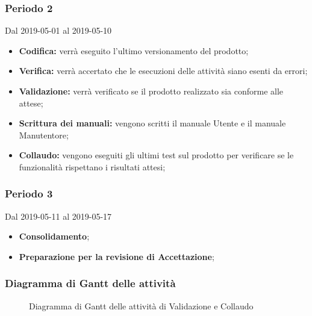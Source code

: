 \subsubsection{Periodo 2} 
Dal 2019-05-01 al 2019-05-10
\begin{itemize}
	\item \textbf{Codifica:} verrà eseguito l'ultimo versionamento del prodotto;
	\item \textbf{Verifica:} verrà accertato che le esecuzioni delle attività siano esenti da errori;
	\item \textbf{Validazione:} verrà verificato se il prodotto realizzato sia conforme alle attese;
	\item \textbf{Scrittura dei manuali:} vengono scritti il manuale Utente e il manuale Manutentore;
	\item \textbf{Collaudo:} vengono eseguiti gli ultimi test sul prodotto per verificare se le funzionalità rispettano i risultati attesi;
\end{itemize}
\subsubsection{Periodo 3} 
Dal 2019-05-11 al 2019-05-17
\begin{itemize}
	\item \textbf{Consolidamento};
	\item \textbf{Preparazione per la revisione di Accettazione};
\end{itemize}
\subsubsection{Diagramma di Gantt delle attività}
\begin{figure}[h]
	\caption{Diagramma di Gantt delle attività di Validazione e Collaudo}
\end{figure}
